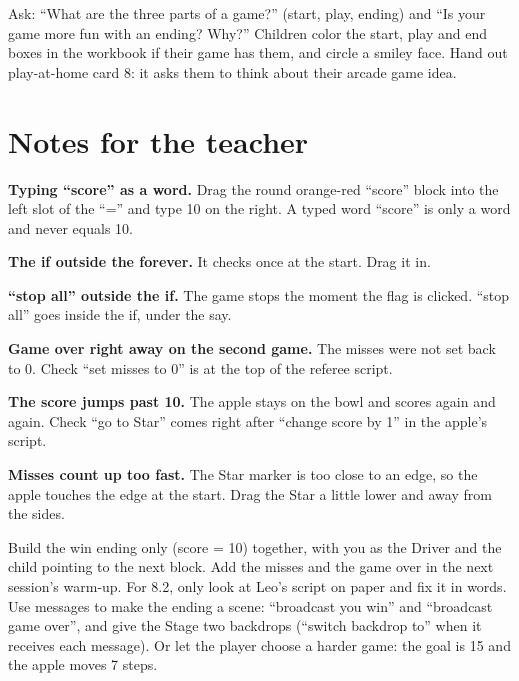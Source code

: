 \begin{reflection}
Ask: \enquote{What are the three parts of a game?} (start, play, ending) and \enquote{Is your game more fun with an ending? Why?} Children color the start, play and end boxes in the workbook if their game has them, and circle a smiley face. Hand out play-at-home card 8: it asks them to think about their arcade game idea.
\end{reflection}

\section{Notes for the teacher}
\begin{commonmistakes}
  \item \textbf{Typing \enquote{score} as a word.} Drag the round orange-red \enquote{score} block into the left slot of the \enquote{=} and type 10 on the right. A typed word \enquote{score} is only a word and never equals 10.
  \item \textbf{The if outside the forever.} It checks once at the start. Drag it in.
  \item \textbf{\enquote{stop all} outside the if.} The game stops the moment the flag is clicked. \enquote{stop all} goes inside the if, under the say.
  \item \textbf{Game over right away on the second game.} The misses were not set back to 0. Check \enquote{set misses to 0} is at the top of the referee script.
  \item \textbf{The score jumps past 10.} The apple stays on the bowl and scores again and again. Check \enquote{go to Star} comes right after \enquote{change score by 1} in the apple's script.
  \item \textbf{Misses count up too fast.} The Star marker is too close to an edge, so the apple touches the edge at the start. Drag the Star a little lower and away from the sides.
\end{commonmistakes}

\begin{differentiation}
\supportpath Build the win ending only (score = 10) together, with you as the Driver and the child pointing to the next block. Add the misses and the game over in the next session's warm-up. For 8.2, only look at Leo's script on paper and fix it in words.
\extensionpath Use messages to make the ending a scene: \enquote{broadcast you win} and \enquote{broadcast game over}, and give the Stage two backdrops (\enquote{switch backdrop to} when it receives each message). Or let the player choose a harder game: the goal is 15 and the apple moves 7 steps.
\end{differentiation}

